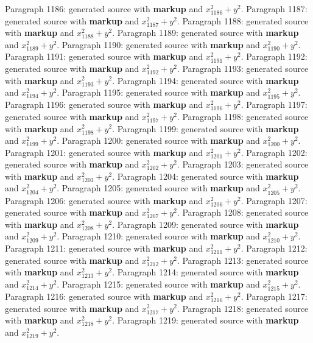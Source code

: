 \documentclass{article}
\begin{document}
Paragraph 1186: generated source with \textbf{markup} and $x_{1186}^2 + y^2$.
Paragraph 1187: generated source with \textbf{markup} and $x_{1187}^2 + y^2$.
Paragraph 1188: generated source with \textbf{markup} and $x_{1188}^2 + y^2$.
Paragraph 1189: generated source with \textbf{markup} and $x_{1189}^2 + y^2$.
Paragraph 1190: generated source with \textbf{markup} and $x_{1190}^2 + y^2$.
Paragraph 1191: generated source with \textbf{markup} and $x_{1191}^2 + y^2$.
Paragraph 1192: generated source with \textbf{markup} and $x_{1192}^2 + y^2$.
Paragraph 1193: generated source with \textbf{markup} and $x_{1193}^2 + y^2$.
Paragraph 1194: generated source with \textbf{markup} and $x_{1194}^2 + y^2$.
Paragraph 1195: generated source with \textbf{markup} and $x_{1195}^2 + y^2$.
Paragraph 1196: generated source with \textbf{markup} and $x_{1196}^2 + y^2$.
Paragraph 1197: generated source with \textbf{markup} and $x_{1197}^2 + y^2$.
Paragraph 1198: generated source with \textbf{markup} and $x_{1198}^2 + y^2$.
Paragraph 1199: generated source with \textbf{markup} and $x_{1199}^2 + y^2$.
Paragraph 1200: generated source with \textbf{markup} and $x_{1200}^2 + y^2$.
Paragraph 1201: generated source with \textbf{markup} and $x_{1201}^2 + y^2$.
Paragraph 1202: generated source with \textbf{markup} and $x_{1202}^2 + y^2$.
Paragraph 1203: generated source with \textbf{markup} and $x_{1203}^2 + y^2$.
Paragraph 1204: generated source with \textbf{markup} and $x_{1204}^2 + y^2$.
Paragraph 1205: generated source with \textbf{markup} and $x_{1205}^2 + y^2$.
Paragraph 1206: generated source with \textbf{markup} and $x_{1206}^2 + y^2$.
Paragraph 1207: generated source with \textbf{markup} and $x_{1207}^2 + y^2$.
Paragraph 1208: generated source with \textbf{markup} and $x_{1208}^2 + y^2$.
Paragraph 1209: generated source with \textbf{markup} and $x_{1209}^2 + y^2$.
Paragraph 1210: generated source with \textbf{markup} and $x_{1210}^2 + y^2$.
Paragraph 1211: generated source with \textbf{markup} and $x_{1211}^2 + y^2$.
Paragraph 1212: generated source with \textbf{markup} and $x_{1212}^2 + y^2$.
Paragraph 1213: generated source with \textbf{markup} and $x_{1213}^2 + y^2$.
Paragraph 1214: generated source with \textbf{markup} and $x_{1214}^2 + y^2$.
Paragraph 1215: generated source with \textbf{markup} and $x_{1215}^2 + y^2$.
Paragraph 1216: generated source with \textbf{markup} and $x_{1216}^2 + y^2$.
Paragraph 1217: generated source with \textbf{markup} and $x_{1217}^2 + y^2$.
Paragraph 1218: generated source with \textbf{markup} and $x_{1218}^2 + y^2$.
Paragraph 1219: generated source with \textbf{markup} and $x_{1219}^2 + y^2$.
\end{document}
